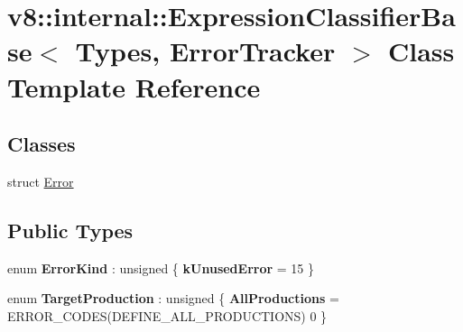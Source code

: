 \hypertarget{classv8_1_1internal_1_1ExpressionClassifierBase}{}\section{v8\+:\+:internal\+:\+:Expression\+Classifier\+Base$<$ Types, Error\+Tracker $>$ Class Template Reference}
\label{classv8_1_1internal_1_1ExpressionClassifierBase}
\subsection*{Classes}
\begin{DoxyCompactItemize}
\item 
struct \mbox{\hyperlink{structv8_1_1internal_1_1ExpressionClassifierBase_1_1Error}{Error}}
\end{DoxyCompactItemize}
\subsection*{Public Types}
\begin{DoxyCompactItemize}
\item 
\mbox{\label{classv8_1_1internal_1_1ExpressionClassifierBase_a0908dede1ae40a8f806bd722a297b00a}} 
enum {\bfseries Error\+Kind} \+: unsigned \{ {\bfseries k\+Unused\+Error} = 15
 \}
\item 
\mbox{\label{classv8_1_1internal_1_1ExpressionClassifierBase_adaf37aaba028e65e96a559a1aa79f9a2}} 
enum {\bfseries Target\+Production} \+: unsigned \{ {\bfseries All\+Productions} = E\+R\+R\+O\+R\+\_\+\+C\+O\+D\+ES(D\+E\+F\+I\+N\+E\+\_\+\+A\+L\+L\+\_\+\+P\+R\+O\+D\+U\+C\+T\+I\+O\+NS) 0
 \}
\end{DoxyCompactItemize}
